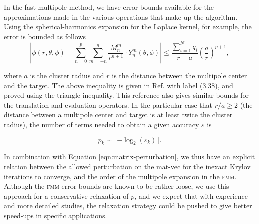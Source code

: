 \documentclass[final,3p,times]{elsarticle}
\newcommand{\fmm}{\textsc{fmm}\xspace}
\begin{document}
In the fast multipole method, we have error bounds available for the approximations made in the various operations that make up the algorithm. Using the spherical-harmonics expansion for the Laplace kernel, for example, the error is bounded as follows 
%
\begin{equation}\label{eqn:multipole_error}
	\left | \phi(r, \theta, \phi) - \sum_{n=0}^{p}\sum_{m=-n}^{n}\frac{M^{m}_{n}}{r^{n+1}}\cdot Y^{m}_{n}(\theta, \phi) \right | \leq \frac{\sum_{i=1}^{N}q_{i}}{r-a}\left ( \frac{a}{r} \right )^{p+1},
\end{equation}

\noindent where $a$ is the  cluster radius and $r$ is the distance between the multipole center and the target. The above inequality is given in Ref. \cite[p.~55]{greengard1987} with label (3.38), and proved using the triangle inequality. This reference also gives similar bounds for the translation and evaluation operators. In the particular case that $r/a\geq 2$ (the distance between a multipole center and target is at least twice the cluster radius), the number of terms needed to obtain a given accuracy $\varepsilon$ is 

\begin{equation}\label{eqn:fmm_p}
	p_k \sim \lceil -\log_{2}(\varepsilon_k) \rceil.
\end{equation}

\noindent In combination with Equation \eqref{eqn:matrix-perturbation}, we thus have an explicit  relation between the allowed perturbation on the mat-vec for the inexact Krylov iterations to converge, and the order of the multipole expansion in the \fmm.
Although the \fmm error bounds are known to be rather loose, we use this approach for a conservative relaxation of $p$, and we expect that with experience and more detailed studies, the relaxation strategy could be pushed to give better speed-ups in specific applications.


\end{document}
